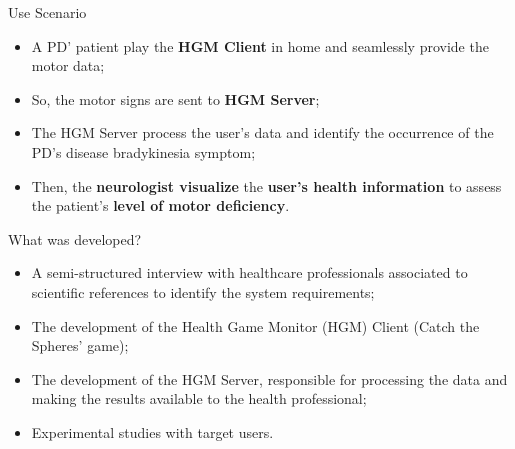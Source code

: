 \documentclass{beamer}
\begin{document}
%


\begin{frame}{Use Scenario}
   \begin{block}{}
      \begin{itemize}[<+->]
       \item A PD' patient play the \textbf{HGM Client} in home and seamlessly provide the motor data;
       \item So, the motor signs are sent to \textbf{HGM Server};
       \item The HGM Server process the user's data and identify the occurrence of the PD's disease bradykinesia symptom;
       \item Then, the \textbf{neurologist visualize} the \textbf{user's health information} to assess the patient's \textbf{level of motor deficiency}.
      \end{itemize}
  \end{block}
\end{frame}



\begin{frame}{What was developed?}
    \begin{block}{}
        \begin{itemize}[<+->]
            \item  A semi-structured interview with healthcare professionals associated to scientific references to identify the system requirements;
            \item The development of the Health Game Monitor (HGM) Client (Catch the Spheres' game);
            \item The development of the HGM Server, responsible for processing the data and making the results available to the health professional;
						\item Experimental studies with target users.
        \end{itemize}
    \end{block}
\end{frame}
\end{document}
